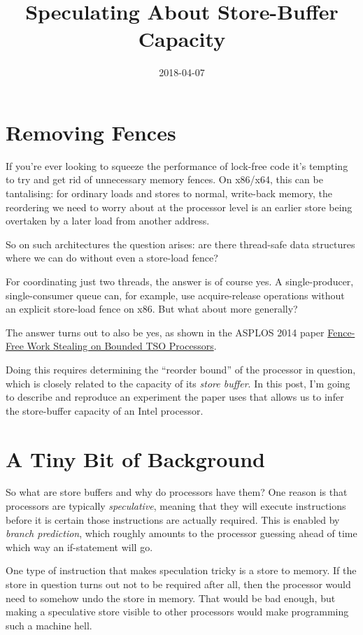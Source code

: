 \documentclass[11pt]{article}
\title{Speculating About Store-Buffer Capacity}
\date{2018-04-07}
\begin{document}
\section{Removing Fences}

If you're ever looking to squeeze the performance of lock-free code it's tempting to try and get rid of unnecessary memory fences. On x86/x64, this can be tantalising: for ordinary loads and stores to normal, write-back memory, the reordering we need to worry about at the processor level is an earlier store being overtaken by a later load from another address.

So on such architectures the question arises: are there thread-safe data structures where we can do without even a store-load fence?

For coordinating just two threads, the answer is of course yes. A single-producer, single-consumer queue can, for example, use acquire-release operations without an explicit store-load fence on x86. But what about more generally?

The answer turns out to also be yes, as shown in the ASPLOS 2014 paper \href{https://www.cs.tau.ac.il/~mad/publications/asplos2014-ffwsq.pdf}{Fence-Free Work Stealing on Bounded TSO Processors}.

Doing this requires determining the ``reorder bound'' of the processor in question, which is closely related to the capacity of its \emph{store buffer}. In this post, I'm going to describe and reproduce an experiment the paper uses that allows us to infer the store-buffer capacity of an Intel processor.

\section{A Tiny Bit of Background}

So what are store buffers and why do processors have them? One reason is that processors are typically \emph{speculative}, meaning that they will execute instructions before it is certain those instructions are actually required. This is enabled by \emph{branch prediction}, which roughly amounts to the processor guessing ahead of time which way an if-statement will go.

One type of instruction that makes speculation tricky is a store to memory. If the store in question turns out not to be required after all, then the processor would need to somehow undo the store in memory. That would be bad enough, but making a speculative store visible to other processors would make programming such a machine hell.
\end{document}
